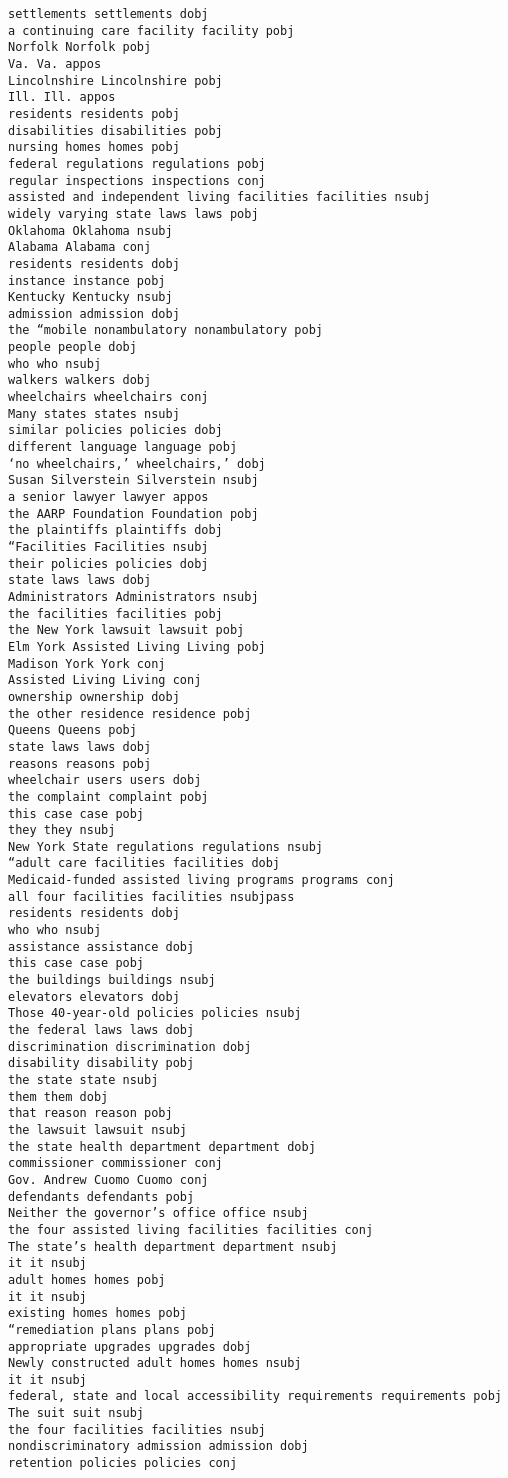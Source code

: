 \documentclass[11pt]{article}
\begin{document}
\begin{Verbatim}[commandchars=\\\{\}]
settlements settlements dobj
a continuing care facility facility pobj
Norfolk Norfolk pobj
Va. Va. appos
Lincolnshire Lincolnshire pobj
Ill. Ill. appos
residents residents pobj
disabilities disabilities pobj
nursing homes homes pobj
federal regulations regulations pobj
regular inspections inspections conj
assisted and independent living facilities facilities nsubj
widely varying state laws laws pobj
Oklahoma Oklahoma nsubj
Alabama Alabama conj
residents residents dobj
instance instance pobj
Kentucky Kentucky nsubj
admission admission dobj
the “mobile nonambulatory nonambulatory pobj
people people dobj
who who nsubj
walkers walkers dobj
wheelchairs wheelchairs conj
Many states states nsubj
similar policies policies dobj
different language language pobj
‘no wheelchairs,’ wheelchairs,’ dobj
Susan Silverstein Silverstein nsubj
a senior lawyer lawyer appos
the AARP Foundation Foundation pobj
the plaintiffs plaintiffs dobj
“Facilities Facilities nsubj
their policies policies dobj
state laws laws dobj
Administrators Administrators nsubj
the facilities facilities pobj
the New York lawsuit lawsuit pobj
Elm York Assisted Living Living pobj
Madison York York conj
Assisted Living Living conj
ownership ownership dobj
the other residence residence pobj
Queens Queens pobj
state laws laws dobj
reasons reasons pobj
wheelchair users users dobj
the complaint complaint pobj
this case case pobj
they they nsubj
New York State regulations regulations nsubj
“adult care facilities facilities dobj
Medicaid-funded assisted living programs programs conj
all four facilities facilities nsubjpass
residents residents dobj
who who nsubj
assistance assistance dobj
this case case pobj
the buildings buildings nsubj
elevators elevators dobj
Those 40-year-old policies policies nsubj
the federal laws laws dobj
discrimination discrimination dobj
disability disability pobj
the state state nsubj
them them dobj
that reason reason pobj
the lawsuit lawsuit nsubj
the state health department department dobj
commissioner commissioner conj
Gov. Andrew Cuomo Cuomo conj
defendants defendants pobj
Neither the governor’s office office nsubj
the four assisted living facilities facilities conj
The state’s health department department nsubj
it it nsubj
adult homes homes pobj
it it nsubj
existing homes homes pobj
“remediation plans plans pobj
appropriate upgrades upgrades dobj
Newly constructed adult homes homes nsubj
it it nsubj
federal, state and local accessibility requirements requirements pobj
The suit suit nsubj
the four facilities facilities nsubj
nondiscriminatory admission admission dobj
retention policies policies conj

\end{Verbatim}
\end{document}
